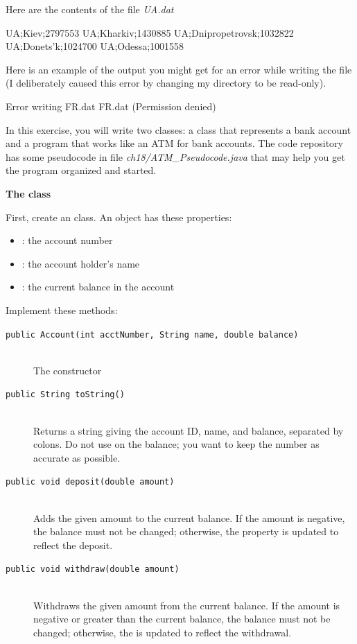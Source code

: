 \begin{exercise}
Here are the contents of the file {\em UA.dat}

\begin{stdout}
UA;Kiev;2797553
UA;Kharkiv;1430885
UA;Dnipropetrovsk;1032822
UA;Donets'k;1024700
UA;Odessa;1001558
\end{stdout}

Here is an example of the output you might get for an error while writing the file (I deliberately caused this error by changing my directory to be read-only).

\begin{stdout}
Error writing FR.dat
FR.dat (Permission denied)
\end{stdout}

\end{exercise}

\begin{exercise}
In this exercise, you will write two classes: a class that represents a bank account and a program that works like an ATM for bank accounts. The code repository has some pseudocode in file {\em ch18/ATM\_Pseudocode.java} that may help you get the program organized and started. 

{\large\bf{The  class}}

First, create an  class. An  object has these properties:

\begin{itemize}
    \item {}: the account number
    \item {}: the account holder's name
    \item {}: the current balance in the account
\end{itemize}

Implement these methods:

\begin{description}
    \item[\texttt{public Account(int acctNumber, String name, double balance)}] \hfill \\ The constructor
    \item[\texttt{public String toString()}] \hfill \\  Returns a string giving the account ID, name, and balance, separated by colons. Do not use  on the balance; you want to keep the number as accurate as possible.
    \item[\texttt{public void deposit(double amount)}] \hfill \\  Adds the given amount to the current balance. If the amount is negative, the balance must not be changed; otherwise, the  property is updated to reflect the deposit.
    \item[\texttt{public void withdraw(double amount)}] \hfill \\ Withdraws the given amount from the current balance. If the amount is negative or greater than the current balance, the balance must not be changed; otherwise, the  is updated to reflect the withdrawal.
\end{description}


\end{exercise}
